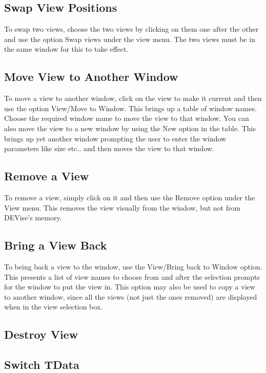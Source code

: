\subsection{Swap View Positions}

To swap two views, choose the two views by clicking on them one after the other and use the option Swap views under the view menu. The two views must be in the same window for this to take effect.

\subsection{Move View to Another Window}

To move a view to another window, click on the view to make it current and then use the option View/Move to Window. This brings up a table of window names. Choose the required window name to move the view to that window. You can also move the view to a new window by using the New option in the table. This brings up yet another window prompting the user to enter the window parameters like size etc.. and then moves the view to that window.

\subsection{Remove a View}

To remove a view, simply click on it and then use the Remove option under the View menu. This removes the view visually from the window, but not from DEVise's memory. 

\subsection{Bring a View Back}

To being back a view to the window, use the View/Bring back to Window option. This presents a list of view names to choose from and after the selection prompts for the window to put the view in. This option may also be used to copy a view to another window, since all the views (not just the ones removed) are displayed when in the view selection box.

\subsection{Destroy View}


\subsection{Switch TData}

